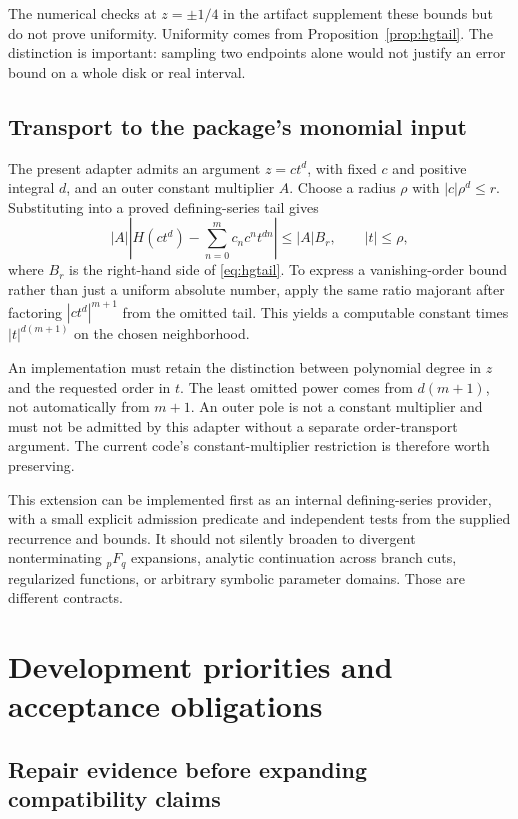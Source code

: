 \documentclass[11pt,letterpaper]{article}
\begin{document}
The numerical checks at $z=\pm1/4$ in the artifact supplement these bounds but do not prove uniformity. Uniformity comes from Proposition~\ref{prop:hgtail}. The distinction is important: sampling two endpoints alone would not justify an error bound on a whole disk or real interval.

\subsection{Transport to the package's monomial input}

The present adapter admits an argument $z=c t^d$, with fixed $c$ and positive integral $d$, and an outer constant multiplier $A$. Choose a radius $\rho$ with $|c|\rho^d\le r$. Substituting into a proved defining-series tail gives
\[
 |A|\left|H(c t^d)-\sum_{n=0}^m c_n c^n t^{dn}\right|
 \le |A|B_r,\qquad |t|\le\rho,
\]
where $B_r$ is the right-hand side of \eqref{eq:hgtail}. To express a vanishing-order bound rather than just a uniform absolute number, apply the same ratio majorant after factoring $|c t^d|^{m+1}$ from the omitted tail. This yields a computable constant times $|t|^{d(m+1)}$ on the chosen neighborhood.

An implementation must retain the distinction between polynomial degree in $z$ and the requested order in $t$. The least omitted power comes from $d(m+1)$, not automatically from $m+1$. An outer pole is not a constant multiplier and must not be admitted by this adapter without a separate order-transport argument. The current code's constant-multiplier restriction is therefore worth preserving.

This extension can be implemented first as an internal defining-series provider, with a small explicit admission predicate and independent tests from the supplied recurrence and bounds. It should not silently broaden to divergent nonterminating ${}_pF_q$ expansions, analytic continuation across branch cuts, regularized functions, or arbitrary symbolic parameter domains. Those are different contracts.

\section{Development priorities and acceptance obligations}
\subsection{Repair evidence before expanding compatibility claims}
\end{document}
